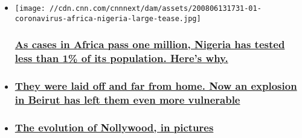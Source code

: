 \begin{itemize}
\item
  \href{/2020/08/07/africa/africa-surpasses-one-million-cases-intl/index.html}{}

  \texttt{[image: //cdn.cnn.com/cnnnext/dam/assets/200806131731-01-coronavirus-africa-nigeria-large-tease.jpg]}

  \hypertarget{as-cases-in-africa-pass-one-million-nigeria-has-tested-less-than-1-of-its-population-heres-why}{%
  \subsubsection{\texorpdfstring{\href{/2020/08/07/africa/africa-surpasses-one-million-cases-intl/index.html}{As
  cases in Africa pass one million, Nigeria has tested less than 1\% of
  its population. Here's
  why.}}{As cases in Africa pass one million, Nigeria has tested less than 1\% of its population. Here's why.}}\label{as-cases-in-africa-pass-one-million-nigeria-has-tested-less-than-1-of-its-population-heres-why}}
\item
  \hypertarget{they-were-laid-off-and-far-from-home-now-an-explosion-in-beirut-has-left-them-even-more-vulnerable}{%
  \subsubsection{\texorpdfstring{\href{/2020/08/07/africa/beirut-domestic-workers-ethiopia-intl/index.html}{They
  were laid off and far from home. Now an explosion in Beirut has left
  them even more
  vulnerable}}{They were laid off and far from home. Now an explosion in Beirut has left them even more vulnerable}}\label{they-were-laid-off-and-far-from-home-now-an-explosion-in-beirut-has-left-them-even-more-vulnerable}}
\item
  \hypertarget{the-evolution-of-nollywood-in-pictures}{%
  \subsubsection{\texorpdfstring{\href{/2017/02/15/africa/gallery/nollywood-portraits/index.html}{The
  evolution of Nollywood, in
  pictures}}{The evolution of Nollywood, in pictures}}\label{the-evolution-of-nollywood-in-pictures}}
\end{itemize}

